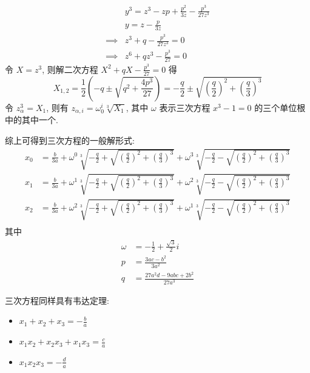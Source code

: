 \[ \begin{aligned}
    & y^3 = z^3 - zp + \frac{p^2}{3z} - \frac{p^3}{27z^3} \\
    & y = z - \frac{p}{3z} \\
    \implies & z^3 + q - \frac{p^3}{27z^3} = 0 \\
    \implies & z^6 + qz^3 - \frac{p^3}{27} = 0
\end{aligned} \]
令 $X = z^3$, 则解二次方程 $X^2 + qX - \frac{p^3}{27} = 0$ 得
\[
X_{1, 2} = \frac12 (-q \pm \sqrt{q^2 + \frac{4p^3}{27}}) = -\frac{q}{2} \pm \sqrt{(\frac{q}{2})^2 + (\frac{q}{3})^3}
\]
令 $z_\alpha^3 = X_1$, 则有 $z_{\alpha, i} = \omega^i_0 \sqrt[3]{X_1}$, 其中 $\omega$ 表示三次方程 $x^3-1 = 0$ 的三个单位根中的其中一个.

综上可得到三次方程的一般解形式:
\[ \begin{aligned}
    x_0 &= \frac{b}{3a} + \omega^{0} \sqrt[3]{-\frac{q}{2}+\sqrt{(\frac{q}{2})^2 + (\frac{q}{3})^3}} + \omega^{3} \sqrt[3]{-\frac{q}{2}-\sqrt{(\frac{q}{2})^2 + (\frac{q}{3})^3}} \\
    x_1 &= \frac{b}{3a} + \omega^{1} \sqrt[3]{-\frac{q}{2}+\sqrt{(\frac{q}{2})^2 + (\frac{q}{3})^3}} + \omega^{2} \sqrt[3]{-\frac{q}{2}-\sqrt{(\frac{q}{2})^2 + (\frac{q}{3})^3}} \\
    x_2 &= \frac{b}{3a} + \omega^{2} \sqrt[3]{-\frac{q}{2}+\sqrt{(\frac{q}{2})^2 + (\frac{q}{3})^3}} + \omega^{1} \sqrt[3]{-\frac{q}{2}-\sqrt{(\frac{q}{2})^2 + (\frac{q}{3})^3}} \\   
\end{aligned} \]
其中
\[ \begin{aligned}
\omega &= -\frac{1}{2} + \frac{\sqrt{3}}{2} i \\
p &= \frac{3ac-b^2}{3a^2} \\
q &= \frac{27a^2d - 9abc + 2b^2}{27a^3}
\end{aligned} \]

三次方程同样具有韦达定理:
\begin{itemize}
\item $x_1 + x_2 + x_3 = -\frac{b}{a}$
\item $x_1 x_2 + x_2 x_3 + x_1 x_3 = \frac{c}{a}$
\item $x_1 x_2 x_3 = -\frac{d}{a}$
\end{itemize}

\endinput